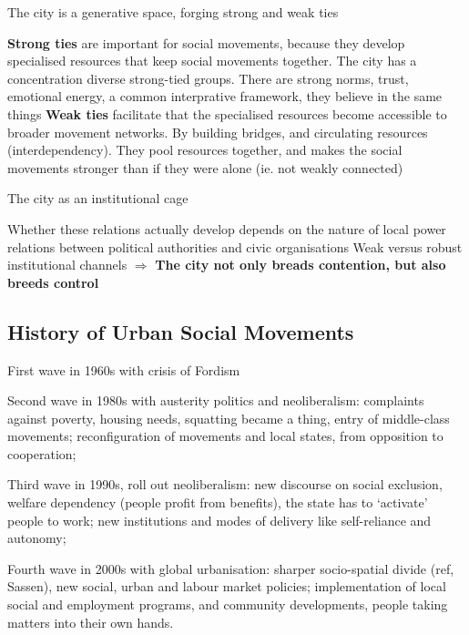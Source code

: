 \documentclass{article}
\begin{document}
The city is a generative space, forging strong and weak ties

\begin{outline}
	\1 \textbf{Strong ties} are important for social movements, because they develop specialised resources that keep social movements together. The city has a concentration diverse strong-tied groups. There are strong norms, trust, emotional energy, a common interprative framework, they believe in the same things
	\1 \textbf{Weak ties} facilitate that the specialised resources become accessible to broader movement networks. By building bridges, and circulating resources (interdependency). They pool resources together, and makes the social movements stronger than if they were alone (ie. not weakly connected)
\end{outline}

The city as an institutional cage

\begin{outline}
	\1 Whether these relations actually develop depends on the nature of local power relations between political authorities and civic organisations
	\1 Weak versus robust institutional channels
	\1 $\Rightarrow$ \textbf{The city not only breads contention, but also breeds control}
\end{outline}

\subsection{History of Urban Social Movements}

First wave in 1960s with crisis of Fordism

Second wave in 1980s with austerity politics and neoliberalism: complaints against poverty, housing needs, squatting became a thing, entry of middle-class movements; reconfiguration of movements and local states, from opposition to cooperation;

Third wave in 1990s, roll out neoliberalism: new discourse on social exclusion, welfare dependency (people profit from benefits), the state has to `activate' people to work; new institutions and modes of delivery like self-reliance and autonomy;

Fourth wave in 2000s with global urbanisation: sharper socio-spatial divide (ref, Sassen), new social, urban and labour market policies; implementation of local social and employment programs, and community developments, people taking matters into their own hands.
\end{document}
